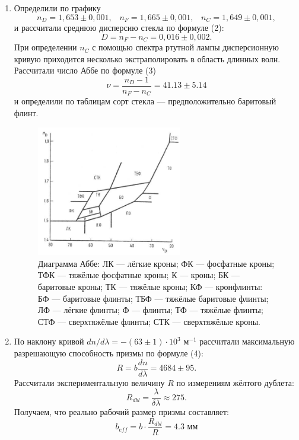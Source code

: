 \begin{enumerate}
	\item Определили по графику 
	\begin{equation*}
	n_D = 1{,}653\pm0{,}001,\;\;\;n_F = 1{,}665\pm0{,}001,\;\;\;n_C = 1{,}649\pm0{,}001,
	\end{equation*}
	и рассчитали среднюю дисперсию стекла по формуле (2):
	\begin{equation*}
		D = n_F - n_C = 0{,}016\pm0{,}002.
	\end{equation*}
	При определении $n_C$ с помощью спектра ртутной лампы дисперсионную кривую приходится несколько экстраполировать в область длинных волн. Рассчитали число Аббе по формуле (3)
	\begin{equation*}
	\nu = \dfrac{n_D - 1}{n_F - n_C} = 41.13 \pm 5.14
	\end{equation*}
	 и определили по таблицам сорт стекла --- предположительно баритовый флинт.
	 	\begin{figure}[h]
	 	\begin{center}
	 		\includegraphics[width = 0.6\textwidth]{443-4.jpg}
	 		\caption{\small{Диаграмма Аббе: ЛК — лёгкие кроны; ФК — фосфатные кроны; ТФК — тяжёлые фосфатные кроны; К — кроны; БК — баритовые кроны; ТК — тяжёлые кроны; КФ — кронфлинты: БФ — баритовые флинты; ТБФ — тяжёлые баритовые флинты; ЛФ — лёгкие флинты; Ф — флинты; ТФ — тяжёлые флинты; СТФ — сверхтяжёлые флинты; СТК — сверхтяжёлые кроны.}}
	 	\end{center}
	 \end{figure}
	\item По наклону кривой $dn/d\lambda = -(63\pm1)\cdot10^{3}\text{ м}^{-1
	}$  рассчитали максимальную разрешающую способность призмы по формуле (4):
	\begin{equation*}
	R = b\dfrac{dn}{d\lambda} = 4684\pm95.
	\end{equation*}
	Рассчитали экспериментальную величину $R$ по измерениям жёлтого дублета:
	\begin{equation*}
	R_{dbl} = \dfrac{\lambda}{\delta\lambda} \approx 275.
	\end{equation*}
	Получаем, что реально рабочий размер призмы составляет:
	$$ b_{eff} = b\cdot\frac{R_{dbl}}{R} =  4.3 \text{ мм}$$	
 

\end{enumerate}
